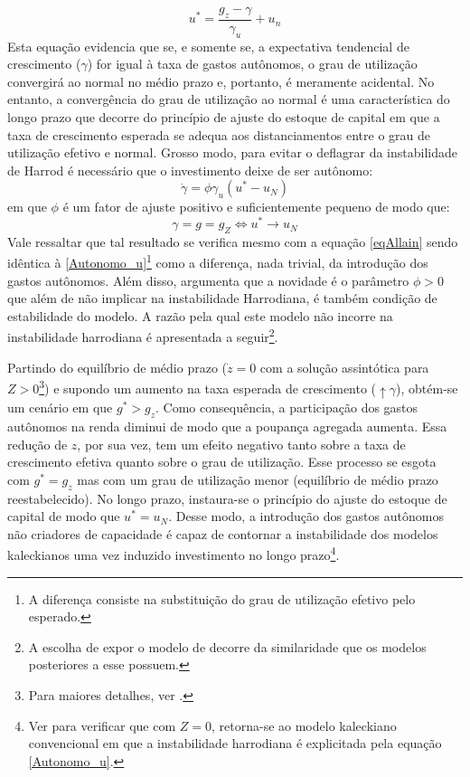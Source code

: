 \begin{equation}
u^* = \frac{g_z - \gamma}{\gamma_u} + u_n
\end{equation}
Esta equação evidencia que se, e somente se, a expectativa tendencial de crescimento ($\gamma$) for igual à taxa de gastos autônomos, o grau de utilização convergirá ao normal no médio prazo e, portanto, é meramente acidental. No entanto, a convergência do grau de utilização ao normal é uma característica do longo prazo que decorre do princípio de ajuste do estoque de capital em que a taxa de crescimento esperada se adequa aos distanciamentos entre o grau de utilização efetivo e normal. Grosso modo, para evitar o deflagrar da instabilidade de Harrod é necessário que o investimento deixe de ser autônomo: 
\begin{equation}
\label{eqAllain}
    \dot \gamma = \phi\gamma_u(u^* - u_N)
\end{equation}
em que $\phi$ é um fator de ajuste positivo e suficientemente pequeno de modo que:
$$
\gamma = g = g_Z \Leftrightarrow u^* \to u_N
$$
Vale ressaltar que tal resultado se verifica mesmo com a equação \ref{eqAllain} sendo idêntica à \ref{Autonomo_u}\footnote{A diferença consiste na substituição do grau de utilização efetivo pelo esperado.} como a diferença, nada trivial, da introdução dos gastos autônomos. Além disso, \textcite[p.~14]{allain_macroeconomic_2014} argumenta que a novidade  é o parâmetro $\phi > 0$ que além de não implicar na instabilidade Harrodiana, é também condição de estabilidade do modelo. A razão pela qual este modelo não incorre na instabilidade harrodiana é apresentada a seguir\footnote{A escolha de expor o modelo de \textcite{allain_macroeconomic_2014} decorre da similaridade que os modelos posteriores a esse possuem.}.

Partindo do equilíbrio de médio prazo ($\dot z = 0$ com a solução assintótica para $Z >0$\footnote{Para maiores detalhes, ver \textcite{fagundes_role_2017}.}) e supondo um aumento na taxa esperada de crescimento ($\uparrow\gamma$), obtém-se um cenário em que $g^* > g_z$. Como consequência, a participação dos gastos autônomos na renda diminui de modo que  a poupança agregada aumenta. Essa redução de $z$, por sua vez, tem um efeito negativo tanto sobre a taxa de crescimento efetiva quanto sobre o grau de utilização. Esse processo se esgota com $g^* = g_z$ mas com um grau de utilização menor  (equilíbrio de médio prazo reestabelecido). No longo prazo, instaura-se o princípio do ajuste do estoque de capital de modo que $u^* = u_N$. Desse modo, a introdução dos gastos autônomos não criadores de capacidade é capaz de contornar a instabilidade dos modelos kaleckianos uma vez induzido investimento no longo prazo\footnote{Ver \textcite[Apêndice A]{allain_macroeconomic_2014} para verificar que com $Z = 0$, retorna-se ao modelo kaleckiano convencional em que a instabilidade harrodiana é explicitada pela equação \ref{Autonomo_u}.}. 

